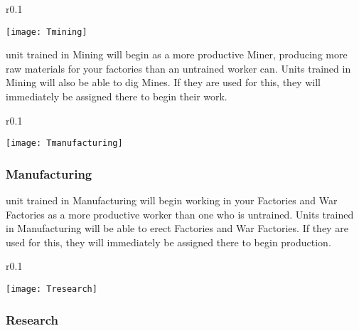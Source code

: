 \begin{wrapfigure}{r}{0.1\textwidth}
    \vspace{-20pt}
    \begin{center}
        \texttt{[image: Tmining]}
    \end{center}
    \vspace{-20pt}
\end{wrapfigure}

 unit trained in Mining will begin as a more productive Miner, producing more raw materials for your factories than an untrained worker can. Units trained in Mining will also be able to dig Mines. If they are used for this, they will immediately be assigned there to begin their work.

\begin{wrapfigure}{r}{0.1\textwidth}
        \begin{center}
        \texttt{[image: Tmanufacturing]}
    \end{center}
    \vspace{-20pt}
\end{wrapfigure}

\subsubsection{\textsf{Manufacturing}}


 unit trained in Manufacturing will begin working in your Factories and War Factories as a more productive worker than one who is untrained. Units trained in Manufacturing will be able to erect Factories and War Factories. If they are used for this, they will immediately be assigned there to begin production.

\begin{wrapfigure}{r}{0.1\textwidth}
        \begin{center}
        \texttt{[image: Tresearch]}
    \end{center}
    \vspace{-20pt}
\end{wrapfigure}

\subsubsection{\textsf{Research}}


